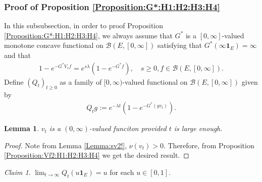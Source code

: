 \documentclass[12pt,a4paper]{amsart}
\numberwithin{equation}{section}
\theoremstyle{plain}
\newtheorem{lem}[thm]{Lemma}
\theoremstyle{definition}
\theoremstyle{remark}
\newtheorem{claim}[thm]{Claim}
\begin{document}
\subsubsection{Proof of Proposition \ref{Proposition:G*:H1:H2:H3:H4}} 
In this subsubsection, in order to proof Proposition \ref{Proposition:G*:H1:H2:H3:H4}, we always assume that $G^*$ is a $[0,\infty]$-valued monotone concave functional on $\mathcal B(E,[0,\infty])$ satisfying that $G^*(\infty \mathbf 1_E) = \infty$ and that 
\begin{align}
  1 - e^{- G^* V_sf} 
  = e^{s\lambda} (1- e^{- G^* f}),
  \quad s \geq 0, f \in \mathcal B(E, [0,\infty]).
  \end{align}
Define $(Q_t)_{t\geq 0}$ as a family of $[0,\infty)$-valued functional on $\mathcal B(E,[0,\infty])$ given by
\begin{align}
 Q_tg 
:= e^{- \lambda t}( 1 - e^{-G^*(gv_t)} ).
 \end{align}
\begin{lem} \label{Lemma:vp:H1:H2:H3:H4} 
$v_t$ is a $(0,\infty)$-valued funciton provided $t$ is large enough. 
\end{lem}
\begin{proof}
Note from Lemma \ref{Lemma:sv2!}, $\nu(v_t)>0$. 
Therefore, from Proposition \ref{Proposition:Vf2:H1:H2:H3:H4} we get the desired result.
\end{proof}
\begin{claim} \label{Claim:GQ:H1:H2:H3:H4} 
 $\lim_{t\to \infty} Q_t(u \mathbf 1_E) = u$ for each $u\in [0,1]$.
\end{claim}
\end{document}
